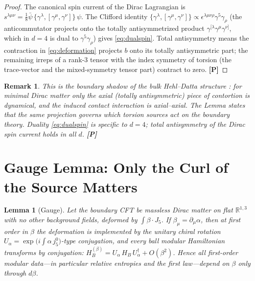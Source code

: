 \documentclass[11pt]{article}
\newtheorem{lemma}[theorem]{Lemma}
\newtheorem{remark}[theorem]{Remark}
\theoremstyle{definition}
\newcommand{\pP}{\textbf{[P]}}
\begin{document}
\begin{proof}
The canonical spin current of the Dirac Lagrangian is
$s^{\lambda\mu\nu}=\tfrac{1}{8}\bar\psi\,
\{\gamma^\lambda,[\gamma^\mu,\gamma^\nu]\}\,\psi$. The Clifford identity
$\{\gamma^\lambda,[\gamma^\mu,\gamma^\nu]\}\propto
\epsilon^{\lambda\mu\nu\rho}\gamma^5\gamma_\rho$ (the anticommutator
projects onto the totally antisymmetrized product
$\gamma^{[\lambda}\gamma^\mu\gamma^{\nu]}$, which in $d=4$ is dual to
$\gamma^5\gamma_\rho$) gives \eqref{eq:dualspin}. Total antisymmetry means
the contraction in \eqref{eq:deformation} projects $b$ onto its totally
antisymmetric part; the remaining irreps of a rank-3 tensor with the index
symmetry of torsion (the trace-vector and the mixed-symmetry tensor part)
contract to zero. \pP{}
\end{proof}

\begin{remark}
This is the boundary shadow of the bulk Hehl--Datta structure
\cite{HehlDatta1971}: for minimal Dirac matter only the axial (totally
antisymmetric) piece of contortion is dynamical, and the induced contact
interaction is axial--axial. The Lemma states that the same projection
governs which torsion \emph{sources} act on the boundary theory. Duality
\eqref{eq:dualspin} is specific to $d=4$; total antisymmetry of the Dirac
spin current holds in all $d$. \pP{}
\end{remark}

\section{Gauge Lemma: Only the Curl of the Source Matters}

\begin{lemma}[Gauge]
\label{lem:gauge}
Let the boundary CFT be massless Dirac matter on flat $\mathbb{R}^{1,3}$
with no other background fields, deformed by
$\int\beta\cdot J_5$. If $\beta_\mu=\partial_\mu\alpha$, then at first
order in $\beta$ the deformation is implemented by the unitary chiral
rotation $U_\alpha=\exp\!\big(i\!\int
\alpha\,j^0_5\big)$-type conjugation, and every ball modular Hamiltonian
transforms by conjugation:
$H_B^{(\beta)}=U_\alpha\,H_B\,U_\alpha^\dagger+O(\beta^2)$. Hence all
first-order modular data---in particular relative entropies and the first
law---depend on $\beta$ only through $d\beta$.
\end{lemma}
\end{document}
